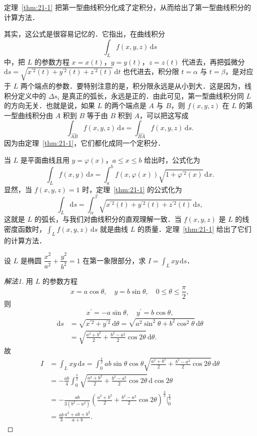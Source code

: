 定理~\ref{thm:21-1} 把第一型曲线积分化成了定积分，从而给出了第一型曲线积分的计算方法．

\begin{sloppypar}
其实，这公式是很容易记忆的．它指出，在曲线积分
\[
\int_{L}f(x,y,z)\,\mathrm{d}s
\]
中，把 $L$ 的参数方程 $x=x(t)$，$y=y(t)$，$z=z(t)$ 代进去，再把弧微分 $\mathrm{d}s=\sqrt{x^{\prime2}(t)+y^{\prime2}(t)+z^{\prime2}(t)}\,\mathrm{d}t$ 也代进去，积分限 $t=\alpha$ 与 $t=\beta$，是对应于 $L$ 两个端点的参数．要特别注意的是，积分限永远是从小到大．这是因为，线积分定义中的 $\Delta s_{i}$ 是真正的弧长，永远是正的．由此可见，第一型曲线积分同 $L$ 的方向无关．也就是说，如果 $L$ 的两个端点是 $A$ 与 $B$，则 $f(x,y,z)$ 在 $L$ 的第一型曲线积分由 $A$ 积到 $B$ 等于由 $B$ 积到 $A$，可以把这写成
\[
\int_{\widehat{AB}}f(x,y,z)\,\mathrm{d}s=\int_{\widehat{BA}}f(x,y,z)\,\mathrm{d}s.
\]
因为由定理~\ref{thm:21-1}，它们都化成同一个定积分．
\end{sloppypar}

当 $L$ 是平面曲线且用 $y=\varphi(x)$，$a\leqslant x\leqslant b$ 给出时，公式化为
\[
\int_{L}f(x,y)\,\mathrm{d}s=\int_{a}^{b}f(x,\varphi(x))\sqrt{1+\varphi^{\prime2}(x)}\,\mathrm{d}x.
\]
显然，当 $f(x,y,z)=1$ 时，定理~\ref{thm:21-1} 的公式化为
\[
\int_{L}\mathrm{d}s=\int_{\alpha}^{\beta}\sqrt{x^{\prime2}(t)+y^{\prime2}(t)+z^{\prime2}(t)}\,\mathrm{d}s,
\]
这就是 $L$ 的弧长，与我们对曲线积分的直观理解一致．当 $f(x,y,z)$ 是 $L$ 的线密度函数时，$\displaystyle\int_{L}f(x,y,z)\,\mathrm{d}s$ 就是曲线 $L$ 的质量．定理~\ref{thm:21-1} 给出了它们的计算方法．

\begin{example}\label{ex:21-1-1}
设 $L$ 是椭圆 $\dfrac{x^{2}}{a^{2}}+\dfrac{y^{2}}{b^{2}}=1$ 在第一象限部分，求 $I=\displaystyle\int_{L}xy\,\mathrm{d}s$．
\end{example}

\begin{proof}[解法1]
用 $L$ 的参数方程
\[
x=a\cos\theta,\quad y=b\sin\theta,\quad 0\leqslant\theta\leqslant\frac{\pi}{2},
\]
则
\[
x^{\prime}=-a\sin\theta,\quad y^{\prime}=b\cos\theta,
\]
\[
\begin{aligned}
\mathrm{d}s&=\sqrt{x^{\prime2}+y^{\prime2}}\,\mathrm{d}\theta=\sqrt{a^{2}\sin^{2}\theta+b^{2}\cos^{2}\theta}\,\mathrm{d}\theta\\
&=\sqrt{\frac{a^{2}+b^{2}}{2}+\frac{b^{2}-a^{2}}{2}\cos2\theta}\,\mathrm{d}\theta.
\end{aligned}
\]
故
\[
\begin{aligned}
I&=\int_{L}xy\,\mathrm{d}s=\int_{0}^{\frac{\pi}{2}}ab\sin\theta\cos\theta\sqrt{\frac{a^{2}+b^{2}}{2}+\frac{b^{2}-a^{2}}{2}\cos2\theta}\,\mathrm{d}\theta\\
&=-\frac{ab}{4}\int_{0}^{\frac{\pi}{2}}\sqrt{\frac{a^{2}+b^{2}}{2}+\frac{b^{2}-a^{2}}{2}\cos2\theta}\,\mathrm{d}\cos2\theta\\
&=-\frac{ab}{3(b^{2}-a^{2})}\left(\frac{a^{2}+b^{2}}{2}+\frac{b^{2}-a^{2}}{2}\cos2\theta\right)^{\frac{3}{2}}\Bigg|_{0}^{\frac{\pi}{2}}\\
&=\frac{ab}{3}\frac{a^{2}+ab+b^{2}}{a+b}.
\end{aligned}
\]
\end{proof}

